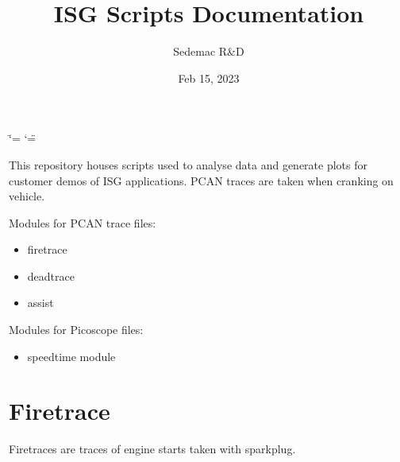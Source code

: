 \documentclass[letterpaper,10pt,english]{sphinxmanual}
\title{ISG Scripts Documentation}
\date{Feb 15, 2023}
\author{Sedemac R\&D}
\begin{document}
\ifdefined\shorthandoff
  \ifnum\catcode`\=\string=\active\shorthandoff{=}\fi
  \ifnum\catcode`\"=\active{}\fi
\fi

\pagestyle{empty}
\sphinxmaketitle
\pagestyle{plain}
\sphinxtableofcontents
\pagestyle{normal}
\label{\detokenize{index::doc}}


\sphinxAtStartPar
This repository houses scripts used to analyse data and generate plots for customer demos of ISG applications.
PCAN traces are taken when cranking on vehicle.

\sphinxAtStartPar
Modules for PCAN trace files:
\begin{itemize}
\item {} 
\sphinxAtStartPar
firetrace

\item {} 
\sphinxAtStartPar
deadtrace

\item {} 
\sphinxAtStartPar
assist

\end{itemize}

\sphinxAtStartPar
Modules for Picoscope  files:
\begin{itemize}
\item {} 
\sphinxAtStartPar
speedtime module

\end{itemize}

\sphinxstepscope


\chapter{Firetrace}
\label{\detokenize{firetrace:firetrace}}\label{\detokenize{firetrace::doc}}
\sphinxAtStartPar
Firetraces are traces of engine starts taken with sparkplug.
\end{document}
